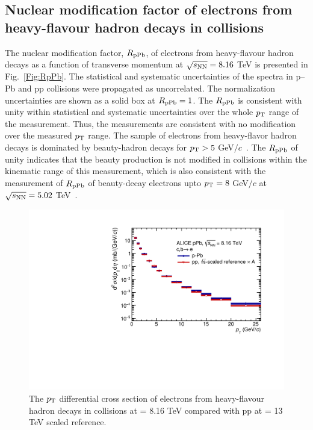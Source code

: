 \subsection{Nuclear modification factor of electrons from heavy-flavour hadron decays in \pPb collisions}
The nuclear modification factor, $R_{\rm{pPb}}$, of electrons from heavy-flavour hadron decays as a function of transverse momentum at $\sqrt{s_{\rm{NN}}} = 8.16$ TeV is presented in Fig.~\ref{Fig:RpPb}. The statistical and systematic uncertainties of the spectra in p–Pb and pp collisions were propagated as uncorrelated. The normalization uncertainties are shown as a solid box at $R_{\rm{pPb}} = 1$. The $R_{\rm{pPb}}$ is consistent with unity within statistical and systematic uncertainties over the whole $p_{\rm{T}}$ range of the
measurement. Thus, the measurements are consistent with no modification over the measured $p_{\rm{T}}$ range. The sample of electrons from heavy-flavor hadron decays is dominated by beauty-hadron decays for $p_{\rm{T}} > 5$ GeV$/c$~\cite{Abelev:2012sca, Abelev:2014hla}. The $R_{\rm{pPb}}$ of unity indicates that the beauty production is not modified in \pPb collisions within the kinematic range of this measurement, which is also consistent with the measurement of $R_{\rm{pPb}}$ of beauty-decay electrons upto $p_{\rm{T}} = 8$ GeV$/c$ at $\sqrt{s_{\rm{NN}}} = 5.02$ TeV~\cite{Adam:2016wyz}. 

\begin{figure}[!ht]
\centering
\includegraphics[width=0.5\linewidth]{figures/Results/HFE_pPb/ppScaledReference.pdf}
\caption{The $p_{\rm{T}}$ differential cross section of electrons from heavy-flavour hadron decays in \pPb collisions at \sqrtsNN = 8.16 TeV compared with pp at \sqrts = 13 TeV scaled reference.}        
\label{Fig:HFESpectraComparison}
\end{figure}

